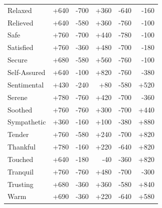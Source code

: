 \begin{longtable}{@{}p{}rrrrr@{}}
Relaxed & +640 & -700 & +360 & -640 & -160 \\
Relieved & +640 & -580 & +360 & -760 & -100 \\
Safe & +760 & -700 & +440 & -780 & -100 \\
Satisfied & +760 & -360 & +480 & -700 & -180 \\
Secure & +680 & -580 & +560 & -760 & -100 \\
Self-Assured & +640 & -100 & +820 & -760 & -380 \\
Sentimental & +430 & -240 & +80 & -580 & +520 \\
Serene & +780 & -760 & +420 & -700 & -360 \\
Soothed & +760 & -760 & +300 & -700 & +440 \\
Sympathetic & +360 & -160 & +100 & -380 & +880 \\
Tender & +760 & -580 & +240 & -700 & +820 \\
Thankful & +780 & -160 & +220 & -640 & +820 \\
Touched & +640 & -180 & -40 & -360 & +820 \\
Tranquil & +760 & -760 & +480 & -700 & -300 \\
Trusting & +680 & -360 & +360 & -580 & +840 \\
Warm & +690 & -360 & +220 & -640 & +580 \\
\end{longtable}
